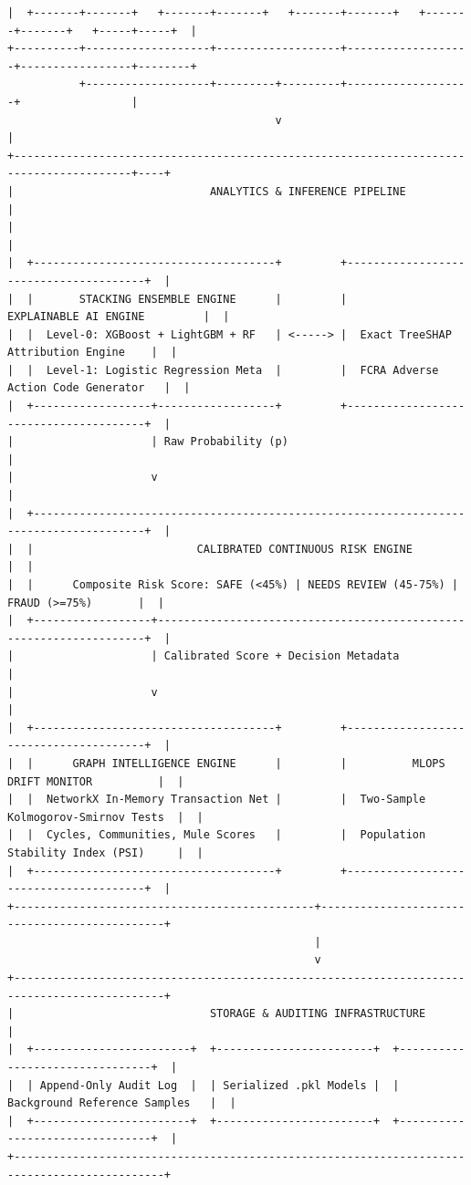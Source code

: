 \documentclass[12pt,a4paper,oneside]{report}
\begin{document}
\begin{lstlisting}
|  +-------+-------+   +-------+-------+   +-------+-------+   +-------+-------+   +-----+-----+  |
+----------+-------------------+-------------------+-------------------+-----------------+--------+
           +-------------------+---------+---------+-------------------+                 |
                                         v                                               |
+----------------------------------------------------------------------------------------+----+
|                              ANALYTICS & INFERENCE PIPELINE                                 |
|                                                                                             |
|  +-------------------------------------+         +---------------------------------------+  |
|  |       STACKING ENSEMBLE ENGINE      |         |         EXPLAINABLE AI ENGINE         |  |
|  |  Level-0: XGBoost + LightGBM + RF   | <-----> |  Exact TreeSHAP Attribution Engine    |  |
|  |  Level-1: Logistic Regression Meta  |         |  FCRA Adverse Action Code Generator   |  |
|  +------------------+------------------+         +---------------------------------------+  |
|                     | Raw Probability (p)                                                   |
|                     v                                                                       |
|  +---------------------------------------------------------------------------------------+  |
|  |                         CALIBRATED CONTINUOUS RISK ENGINE                             |  |
|  |      Composite Risk Score: SAFE (<45%) | NEEDS REVIEW (45-75%) | FRAUD (>=75%)       |  |
|  +------------------+--------------------------------------------------------------------+  |
|                     | Calibrated Score + Decision Metadata                                  |
|                     v                                                                       |
|  +-------------------------------------+         +---------------------------------------+  |
|  |      GRAPH INTELLIGENCE ENGINE      |         |          MLOPS DRIFT MONITOR          |  |
|  |  NetworkX In-Memory Transaction Net |         |  Two-Sample Kolmogorov-Smirnov Tests  |  |
|  |  Cycles, Communities, Mule Scores   |         |  Population Stability Index (PSI)     |  |
|  +-------------------------------------+         +---------------------------------------+  |
+----------------------------------------------+----------------------------------------------+
                                               |
                                               v
+---------------------------------------------------------------------------------------------+
|                              STORAGE & AUDITING INFRASTRUCTURE                              |
|  +------------------------+  +------------------------+  +--------------------------------+  |
|  | Append-Only Audit Log  |  | Serialized .pkl Models |  | Background Reference Samples   |  |
|  +------------------------+  +------------------------+  +--------------------------------+  |
+---------------------------------------------------------------------------------------------+
\end{lstlisting}
\end{document}
